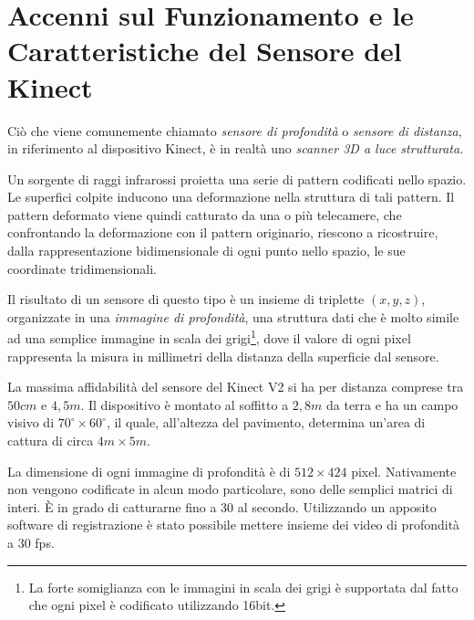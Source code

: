 
\chapter{Accenni sul Funzionamento e le Caratteristiche del Sensore del Kinect} %
\label{chap:kinect}

Ciò che viene comunemente chiamato \emph{sensore di profondità} o \emph{sensore di distanza}, in riferimento al dispositivo Kinect, è in realtà uno \emph{scanner 3D a luce strutturata}.

Un sorgente di raggi infrarossi proietta una serie di pattern codificati nello spazio.
Le superfici colpite inducono una deformazione nella struttura di tali pattern.
Il pattern deformato viene quindi catturato da una o più telecamere, che confrontando la deformazione con il pattern originario, riescono a ricostruire, dalla rappresentazione bidimensionale di ogni punto nello spazio, le sue coordinate tridimensionali.

Il risultato di un sensore di questo tipo è un insieme di triplette $(x,y,z)$, organizzate in una \emph{immagine di profondità}, una struttura dati che è molto simile ad una semplice immagine in scala dei grigi\footnote{La forte somiglianza con le immagini in scala dei grigi è supportata dal fatto che ogni pixel è codificato utilizzando 16bit.}, dove il valore di ogni pixel rappresenta la misura in millimetri della distanza della superficie dal sensore.

La massima affidabilità del sensore del Kinect V2 si ha per distanza comprese tra $50cm$ e $4,5m$.
Il dispositivo è montato al soffitto a $2,8m$ da terra e ha un campo visivo di $70^{\circ} \times 60^{\circ}$, il quale, all'altezza del pavimento, determina un'area di cattura di circa $4m \times 5m$.

La dimensione di ogni immagine di profondità è di $512 \times 424$ pixel. 
Nativamente non vengono codificate in alcun modo particolare, sono delle semplici matrici di interi.
È in grado di catturarne fino a 30 al secondo. 
Utilizzando un apposito software di registrazione è stato possibile mettere insieme dei video di profondità a 30 fps.

